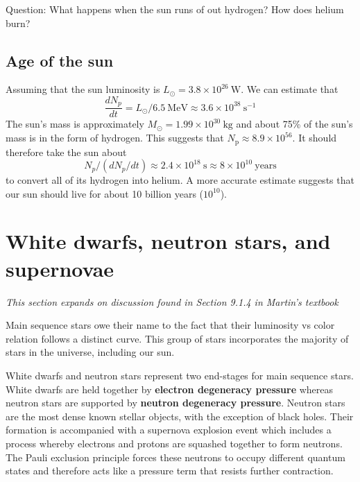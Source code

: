 \documentclass[a4paper,12pt]{article}
\theoremstyle{remark}
\newcommand{\mrm}[1]{\mathrm{#1}}
\renewcommand{\=}[1]{\stackrel{#1}{=}} %
\theoremstyle{plain}
\theoremstyle{definition}
\begin{document}
Question: What happens when the sun runs of out hydrogen? How does helium burn?

\subsection{Age of the sun}
Assuming that the sun luminosity is $L_\odot = 3.8 \times 10^{26} \:\mrm{W}$. We can estimate that 
\begin{equation}
\frac{dN_p}{dt} = L_\odot / 6.5 \:\mrm{MeV} \approx 3.6 \times 10^{38} \:\mrm{s}^{-1}
\end{equation}
The sun's mass is approximately $M _\odot = 1.99 \times 10^{30} \:\mrm{kg}$ and about 75\% of the sun's mass is in the form of hydrogen. This suggests that $N_\mrm{p} \approx 8.9 \times 10^{56}$. It should therefore take the sun about 
\begin{equation}
N_p / (dN_p / dt) \approx 2.4 \times 10^{18} \: \mrm{s} \approx 8 \times 10^{10} \:\mrm{years}
\end{equation}
to convert all of its hydrogen into helium. A more accurate estimate suggests that our sun should live for about 10 billion years ($10^{10}$).

\section{White dwarfs, neutron stars, and supernovae}
\textit{This section expands on discussion found in Section 9.1.4 in Martin's textbook}

Main sequence stars owe their name to the fact that their luminosity vs color relation follows a distinct curve. This group of stars incorporates the majority of stars in the universe, including our sun. 

White dwarfs and neutron stars represent two end-stages for main sequence stars. White dwarfs are held together by \textbf{electron degeneracy pressure} whereas neutron stars are supported by \textbf{neutron degeneracy pressure}. Neutron stars are the most dense known stellar objects, with the exception of black holes. Their formation is accompanied with a supernova explosion event which includes a process whereby electrons and protons are squashed together to form neutrons. The Pauli exclusion principle forces these neutrons to occupy different quantum states and therefore acts like a pressure term that resists further contraction.
\end{document}

